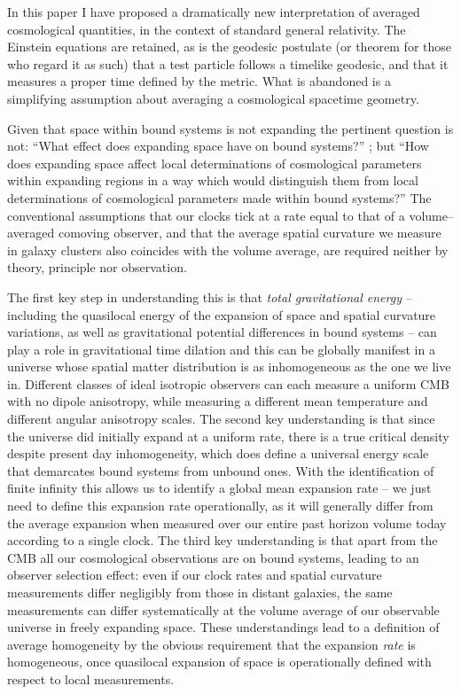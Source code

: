 \documentclass[12pt]{article}
\begin{document}
In this paper I have proposed a dramatically new interpretation of averaged
cosmological quantities, in the context of standard general relativity.
The Einstein equations are retained, as is the geodesic postulate
(or theorem for those who regard it as such) that a test particle follows
a timelike geodesic, and that it measures a proper time defined by the
metric. What is abandoned is a simplifying assumption about
averaging a cosmological spacetime geometry.

Given that space within bound systems is not expanding the pertinent question
is not: ``What effect does expanding space have on bound systems?''
\cite{gruyere}; but ``How does expanding space affect local determinations
of cosmological parameters within expanding regions in a way which would
distinguish them from local determinations of cosmological parameters made
within bound systems?'' The conventional assumptions
that our clocks tick at a rate equal to that of a volume--averaged
comoving observer, and that the average spatial curvature we measure in galaxy
clusters also coincides with the volume average, are required neither by
theory, principle nor observation.

The first key step in understanding this is that {\em total gravitational
energy} -- including the quasilocal energy of the expansion of space and
spatial curvature variations, as well as gravitational potential differences
in bound systems -- can play a role in gravitational time dilation and this
can be globally manifest in a universe whose spatial matter distribution is
as inhomogeneous as the one we live in. Different classes of ideal isotropic
observers can each measure a uniform CMB with no dipole anisotropy, while
measuring a different mean temperature and different angular anisotropy
scales.
The second key understanding is that since the universe did initially expand
at a uniform rate, there is a true critical density despite present day
inhomogeneity, which does define a universal energy scale that demarcates
bound systems from unbound ones. With the identification of finite infinity
this allows us to identify a global mean expansion rate -- we just
need to define this expansion rate operationally, as it will generally
differ from the average expansion when measured over our entire past horizon
volume today according to a single clock. The
third key understanding is that apart from the CMB all our cosmological
observations are on bound systems, leading to an observer selection effect:
even if our clock rates and spatial curvature measurements differ negligibly
from those in distant galaxies, the same measurements can differ
systematically at the volume average of our
observable universe in freely expanding space. These understandings lead to a
definition of average homogeneity by the obvious requirement that
the expansion {\em rate} is homogeneous, once quasilocal expansion of space
is operationally defined with respect to local measurements.
\end{document}
